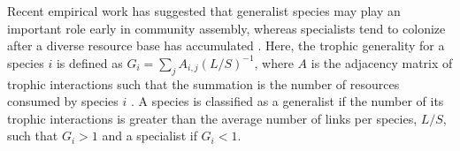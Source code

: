 \documentclass[9pt,twocolumn,twoside]{pnas-new}
\newcommand{\rr}[1]{{\rm #1}}
\begin{document}
Recent empirical work has suggested that generalist species may play an important role early in community assembly, whereas specialists tend to colonize after a diverse resource base has accumulated \cite{Piechnik2008}.
Here, the trophic generality for a species $i$ is defined as $G_i = \sum_{j}A_{i,j}(L/S)^{-1}$, where $A$ is the adjacency matrix of trophic interactions such that the summation is the number of resources consumed by species $i$ \cite{Williams2000}.
A species is classified as a generalist if the number of its trophic interactions is greater than the average number of links per species, $L/S$, such that $G_i > 1$ and a specialist if $G_i < 1$.
\end{document}
